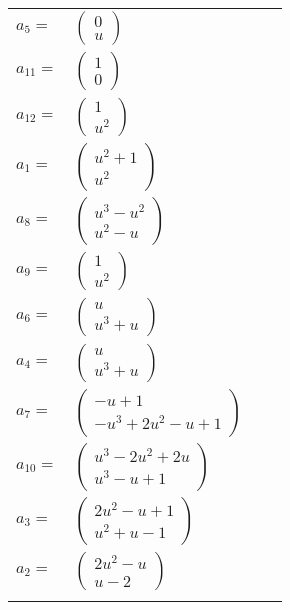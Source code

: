 \documentclass[1p]{elsarticle_modified}
\theoremstyle{definition}
\begin{document}
\begin{tabular}{m{7pt} m{180pt} m{7pt} m{180pt} }
\flushright $a_{5}=$&$\begin{pmatrix}0\\u\end{pmatrix}$ \\
\flushright $a_{11}=$&$\begin{pmatrix}1\\0\end{pmatrix}$ \\
\flushright $a_{12}=$&$\begin{pmatrix}1\\u^2\end{pmatrix}$ \\
\flushright $a_{1}=$&$\begin{pmatrix}u^2+1\\u^2\end{pmatrix}$ \\
\flushright $a_{8}=$&$\begin{pmatrix}u^3- u^2\\u^2- u\end{pmatrix}$ \\
\flushright $a_{9}=$&$\begin{pmatrix}1\\u^2\end{pmatrix}$ \\
\flushright $a_{6}=$&$\begin{pmatrix}u\\u^3+u\end{pmatrix}$ \\
\flushright $a_{4}=$&$\begin{pmatrix}u\\u^3+u\end{pmatrix}$ \\
\flushright $a_{7}=$&$\begin{pmatrix}- u+1\\- u^3+2 u^2- u+1\end{pmatrix}$ \\
\flushright $a_{10}=$&$\begin{pmatrix}u^3-2 u^2+2 u\\u^3- u+1\end{pmatrix}$ \\
\flushright $a_{3}=$&$\begin{pmatrix}2 u^2- u+1\\u^2+u-1\end{pmatrix}$ \\
\flushright $a_{2}=$&$\begin{pmatrix}2 u^2- u\\u-2\end{pmatrix}$\\&\end{tabular}
\end{document}
